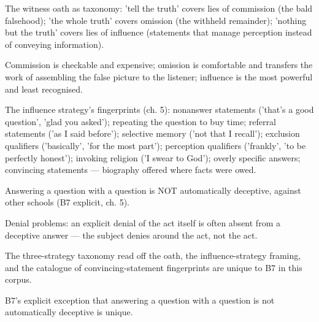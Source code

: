 

\begin{distilled}
  \item The witness oath as taxonomy: 'tell the truth' covers lies of commission (the bald falsehood); 'the whole truth' covers omission (the withheld remainder); 'nothing but the truth' covers lies of influence (statements that manage perception instead of conveying information).
  \item Commission is checkable and expensive; omission is comfortable and transfers the work of assembling the false picture to the listener; influence is the most powerful and least recognised.
  \item The influence strategy's fingerprints (ch. 5): nonanswer statements ('that's a good question', 'glad you asked'); repeating the question to buy time; referral statements ('as I said before'); selective memory ('not that I recall'); exclusion qualifiers ('basically', 'for the most part'); perception qualifiers ('frankly', 'to be perfectly honest'); invoking religion ('I swear to God'); overly specific answers; convincing statements --- biography offered where facts were owed.
  \item Answering a question with a question is NOT automatically deceptive, against other schools (B7 explicit, ch. 5).
  \item Denial problems: an explicit denial of the act itself is often absent from a deceptive answer --- the subject denies around the act, not the act.
\end{distilled}
\begin{unique}
  \item The three-strategy taxonomy read off the oath, the influence-strategy framing, and the catalogue of convincing-statement fingerprints are unique to B7 in this corpus.
  \item B7's explicit exception that answering a question with a question is not automatically deceptive is unique.
\end{unique}
